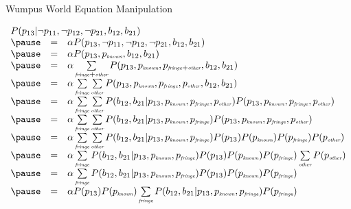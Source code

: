 \documentclass[12pt]{beamer}
\newcommand{\EM}[1]{\mbox{\em#1}}
\begin{document}
\begin{frame}{Wumpus World Equation Manipulation}
	\begin{adjustwidth}{-1em}{-2em}
	\footnotesize
	$
	\begin{array}{lll}
	\lefteqn{P(p_{13}|\lnot p_{11}, \lnot p_{12}, \lnot p_{21}, b_{12}, b_{21})}
	\\
	\pause
	& = & \alpha
	      P(p_{13},
	        \lnot p_{11},
	        \lnot p_{12},
	        \lnot p_{21},
	        b_{12}, b_{21})
	\\
	\pause
	& = & \alpha
	      P(p_{13},
	        p_{\EM{\tiny known}},
	        b_{12}, b_{21})
	\\
	\pause
	& = & \alpha
	      \sum\limits_{\EM{\tiny fringe} + \EM{\tiny other}}
	      P(p_{13},
	        p_{\EM{\tiny known}},
	        p_{\EM{\tiny fringe} + \EM{\tiny other}},
	        b_{12}, b_{21})
	\\
	\pause
	& = & \alpha
	      \sum\limits_{\EM{\tiny fringe}}
	      \sum\limits_{\EM{\tiny other}}
	      P(p_{13},
	        p_{\EM{\tiny known}},
	        p_{\EM{\tiny fringe}},
	        p_{\EM{\tiny other}},
	        b_{12}, b_{21})
	\\
	\pause
	& = & \alpha
	      \sum\limits_{\EM{\tiny fringe}}
	      \sum\limits_{\EM{\tiny other}}
	      P(b_{12}, b_{21}|
	        p_{13},
	        p_{\EM{\tiny known}},
	        p_{\EM{\tiny fringe}},
	        p_{\EM{\tiny other}})
	      P(p_{13},
	        p_{\EM{\tiny known}},
	        p_{\EM{\tiny fringe}},
	        p_{\EM{\tiny other}})
	\\
	\pause
	& = & \alpha
	      \sum\limits_{\EM{\tiny fringe}}
	      \sum\limits_{\EM{\tiny other}}
	      P(b_{12}, b_{21}|
	        p_{13},
	        p_{\EM{\tiny known}},
	        p_{\EM{\tiny fringe}})
	      P(p_{13},
	        p_{\EM{\tiny known}},
	        p_{\EM{\tiny fringe}},
	        p_{\EM{\tiny other}})
	\\
	\pause
	& = & \alpha
	      \sum\limits_{\EM{\tiny fringe}}
	      \sum\limits_{\EM{\tiny other}}
	      P(b_{12}, b_{21}|
	        p_{13},
	        p_{\EM{\tiny known}},
	        p_{\EM{\tiny fringe}})
	      P(p_{13})
	      P(p_{\EM{\tiny known}})
	      P(p_{\EM{\tiny fringe}})
	      P(p_{\EM{\tiny other}})
	\\
	\pause
	& = & \alpha
	      \sum\limits_{\EM{\tiny fringe}}
	      P(b_{12}, b_{21}|
	        p_{13},
	        p_{\EM{\tiny known}},
	        p_{\EM{\tiny fringe}})
	      P(p_{13})
	      P(p_{\EM{\tiny known}})
	      P(p_{\EM{\tiny fringe}})
	      \sum\limits_{\EM{\tiny other}}
	      P(p_{\EM{\tiny other}})
	\\
	\pause
	& = & \alpha
	      \sum\limits_{\EM{\tiny fringe}}
	      P(b_{12}, b_{21}|
	        p_{13},
	        p_{\EM{\tiny known}},
	        p_{\EM{\tiny fringe}})
	      P(p_{13})
	      P(p_{\EM{\tiny known}})
	      P(p_{\EM{\tiny fringe}})
	\\
	\pause
	& = & \alpha
	      P(p_{13})
	      P(p_{\EM{\tiny known}})
	      \sum\limits_{\EM{\tiny fringe}}
	      P(b_{12}, b_{21}|
	        p_{13},
	        p_{\EM{\tiny known}},
	        p_{\EM{\tiny fringe}})
	      P(p_{\EM{\tiny fringe}})
	\end{array}
	$
	\end{adjustwidth}
\end{frame}
\end{document}
